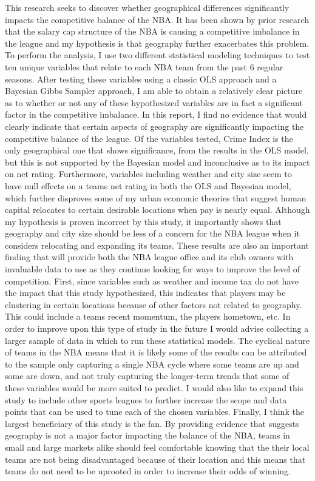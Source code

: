 \documentclass[12pt,english]{article}
\begin{document}
This research seeks to discover whether geographical differences significantly impacts the competitive balance of the NBA. It has been shown by prior research that the salary cap structure of the NBA is causing a competitive imbalance in the league and my hypothesis is that geography further exacerbates this problem. To perform the analysis, I use two different statistical modeling techniques to test ten unique variables that relate to each NBA team from the past 6 regular seasons. After testing these variables using a classic OLS approach and a Bayesian Gibbs Sampler approach, I am able to obtain a relatively clear picture as to whether or not any of these hypothesized variables are in fact a significant factor in the competitive imbalance. In this report, I find no evidence that would clearly indicate that certain aspects of geography are significantly impacting the competitive balance of the league. Of the variables tested, Crime Index is the only geographical one that shows significance, from the results in the OLS model, but this is not supported by the Bayesian model and inconclusive as to its impact on net rating. Furthermore, variables including weather and city size seem to have null effects on a teams net rating in both the OLS and Bayesian model, which further disproves some of my urban economic theories that suggest human capital relocates to certain desirable locations when pay is nearly equal. 
\newline
Although my hypothesis is proven incorrect by this study, it importantly shows that geography and city size should be less of a concern for the NBA league when it considers relocating and expanding its teams. These results are also an important finding that will provide both the NBA league office and its club owners with invaluable data to use as they continue looking for ways to improve the level of competition. First, since variables such as weather and income tax do not have the impact that this study hypothesized, this indicates that players may be clustering in certain locations because of other factors not related to geography. This could include a teams recent momentum, the players hometown, etc.  
\newline
In order to improve upon this type of study in the future I would advise collecting a larger sample of data in which to run these statistical models. The cyclical nature of teams in the NBA means that it is likely some of the results can be attributed to the sample only capturing a single NBA cycle where some teams are up and some are down, and not truly capturing the longer-term trends that some of these variables would be more suited to predict. I would also like to expand this study to include other sports leagues to further increase the scope and data points that can be used to tune each of the chosen variables.
\newline
Finally, I think the largest beneficiary of this study is the fan. By providing evidence that suggests geography is not a major factor impacting the balance of the NBA, teams in small and large markets alike should feel comfortable knowing that the their local teams are not being disadvantaged because of their location and this means that teams do not need to be uprooted in order to increase their odds of winning.
\end{document}
